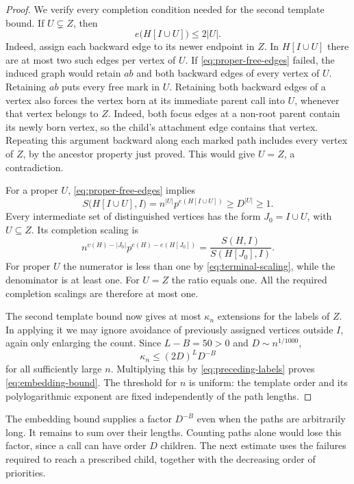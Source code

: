 \begin{proof}
We verify every completion condition needed for the second template
bound. If $U\subsetneq Z$, then
\begin{equation}\label{eq:proper-free-edges}
 e\bigl(H[I\cup U]\bigr)\leq2|U|.
\end{equation}
Indeed, assign each backward edge to its newer endpoint in $Z$. In
$H[I\cup U]$ there are at most two such edges per vertex of $U$.
If \eqref{eq:proper-free-edges} failed, the induced graph would retain
$ab$ and both backward edges of every vertex of $U$. Retaining $ab$
puts every free mark in $U$. Retaining both backward edges of a vertex
also forces the vertex born at its immediate parent call into $U$,
whenever that vertex belongs to $Z$. Indeed, both focus edges at a
non-root parent contain its newly born vertex, so the child's attachment
edge contains that vertex. Repeating this argument backward along each
marked path includes every vertex of $Z$, by the ancestor property just
proved. This would give $U=Z$, a contradiction.

For a proper $U$, \eqref{eq:proper-free-edges} implies
\[
 S\bigl(H[I\cup U],I\bigr)
 =n^{|U|}p^{e(H[I\cup U])}\geq D^{|U|}\geq1.
\]
Every intermediate set of distinguished vertices has the form
$J_0=I\cup U$, with $U\subseteq Z$. Its completion scaling is
\[
 n^{v(H)-|J_0|}p^{e(H)-e(H[J_0])}
 =\frac{S(H,I)}{S(H[J_0],I)}.
\]
For proper $U$ the numerator is less than one by
\eqref{eq:terminal-scaling}, while the denominator is at least one.
For $U=Z$ the ratio equals one. All the required completion scalings are
therefore at most one.

The second template bound now gives at most $\kappa_n$ extensions for the
labels of $Z$. In applying it we may ignore avoidance of previously
assigned vertices outside $I$, again only enlarging the count. Since
$L-B=50>0$ and $D\sim n^{1/1000}$,
\[
 \kappa_n\leq(2D)^L D^{-B}
\]
for all sufficiently large $n$. Multiplying this by
\eqref{eq:preceding-labels} proves \eqref{eq:embedding-bound}.
The threshold for $n$ is uniform: the template order and its
polylogarithmic exponent are fixed independently of the path lengths.
\end{proof}

The embedding bound supplies a factor $D^{-B}$ even when the paths are
arbitrarily long. It remains to sum over their lengths. Counting paths
alone would lose this factor, since a call can have order $D$ children.
The next estimate uses the failures required to reach a prescribed
child, together with the decreasing order of priorities.

